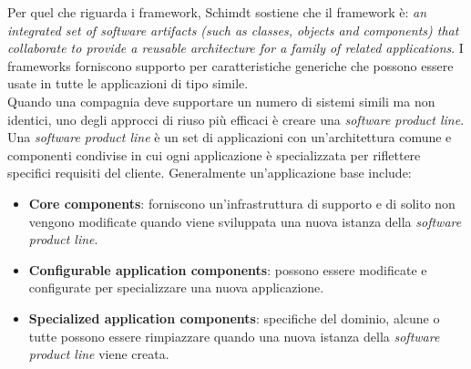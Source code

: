 		 	Per quel che riguarda i framework, Schimdt sostiene che il framework è: \textit{an integrated set of software artifacts (such as classes, objects and components) that collaborate to provide a reusable architecture for a family of related applications}. I frameworks forniscono supporto per caratteristiche generiche che possono essere usate in tutte le applicazioni di tipo simile. \\
		 	Quando una compagnia deve supportare un numero di sistemi simili ma non identici, uno degli approcci di riuso più efficaci è creare una \textit{software product line}. Una \textit{software product line} è un set di applicazioni con un'architettura comune e componenti condivise in cui ogni applicazione è specializzata per riflettere specifici requisiti del cliente.  Generalmente un'applicazione base include:
		 	\begin{itemize}
		 		\item \textbf{Core components}: forniscono un'infrastruttura di supporto e di solito non vengono modificate quando viene sviluppata una nuova istanza della \textit{software product line}.
		 		\item \textbf{Configurable application components}: possono essere modificate e configurate per specializzare una nuova applicazione.
		 		\item \textbf{Specialized application components}: specifiche del dominio, alcune o tutte possono essere rimpiazzare quando una nuova istanza della \textit{software product line} viene creata.
		 	\end{itemize}
	 	 	
